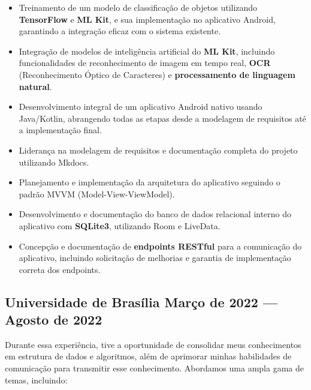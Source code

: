 \documentclass[a4paper,12pt]{article}
\begin{document}
\vspace{-0.5em}
\begin{itemize}
    \item Treinamento de um modelo de classificação de objetos utilizando \textbf{TensorFlow} e\textbf{ ML Kit}, e sua implementação no aplicativo Android, garantindo a integração eficaz com o sistema existente.
    \item Integração de modelos de inteligência artificial do \textbf{ML Kit}, incluindo funcionalidades de reconhecimento de imagem em tempo real, \textbf{OCR} (Reconhecimento Óptico de Caracteres) e \textbf{processamento de linguagem natural}.
    \item Desenvolvimento integral de um aplicativo Android nativo usando Java/Kotlin, abrangendo todas as etapas desde a modelagem de requisitos até a implementação final.
    \item Liderança na modelagem de requisitos e documentação completa do projeto utilizando Mkdocs.
    \item Planejamento e implementação da arquitetura do aplicativo seguindo o padrão MVVM (Model-View-ViewModel).
    \item Desenvolvimento e documentação do banco de dados relacional interno do aplicativo com \textbf{SQLite3}, utilizando Room e LiveData.
    \item Concepção e documentação de \textbf{endpoints RESTful} para a comunicação do aplicativo, incluindo solicitação de melhorias e garantia de implementação correta dos endpoints.
\end{itemize}



\vspace{1.5em}
\vspace*{7pt}
\vspace{1.5em}

\subsection*{\large Universidade de Brasília  \hfill Março de 2022 --- Agosto de 2022}
\vspace*{3pt}
Durante essa experiência, tive a oportunidade de consolidar meus conhecimentos em estrutura de dados e algoritmos, além de aprimorar minhas habilidades de comunicação para transmitir esse conhecimento. Abordamos uma ampla gama de temas, incluindo:
\end{document}
